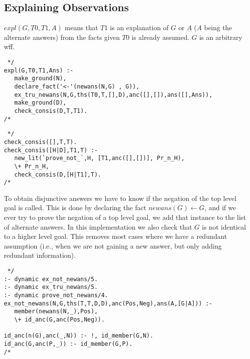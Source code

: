 \subsection{Explaining Observations}
$expl(G,T0,T1,A)$ means that $T1$ is an explanation of $G$ or $A$ ($A$ being
the alternate answers) from the facts given $T0$ is already assumed.
$G$ is an arbitrary wff.
\begin{verbatim} */
expl(G,T0,T1,Ans) :-
   make_ground(N),
   declare_fact('<-'(newans(N,G) , G)),
   ex_tru_newans(N,G,ths(T0,T,[],D),anc([],[]),ans([],Ans)),
   make_ground(D),
   check_consis(D,T,T1).
/* \end{verbatim}

\begin{verbatim} */
check_consis([],T,T).
check_consis([H|D],T1,T) :-
   new_lit(`prove_not_`,H, [T1,anc([],[])], Pr_n_H),
   \+ Pr_n_H,
   check_consis(D,[H|T1],T).
/* \end{verbatim}
To obtain disjunctive answers we have to know if the negation of the top
level goal is called. This is done by declaring the fact
$newans(G) \leftarrow G$, and if we ever try to
prove the negation of a top level goal, we add that instance to the
list of alternate answers. In this implementation we also check
that $G$ is not identical to a higher level goal. This removes most cases
where we have a redundant assumption (i.e., when we are not gaining a new
answer, but only adding redundant information).
\begin{verbatim} */
:- dynamic ex_not_newans/5.
:- dynamic ex_tru_newans/5.
:- dynamic prove_not_newans/4.
ex_not_newans(N,G,ths(T,T,D,D),anc(Pos,Neg),ans(A,[G|A])) :-
   member(newans(N,_),Pos),
   \+ id_anc(G,anc(Pos,Neg)).

id_anc(n(G),anc(_,N)) :- !, id_member(G,N).
id_anc(G,anc(P,_)) :- id_member(G,P).
/* \end{verbatim}

